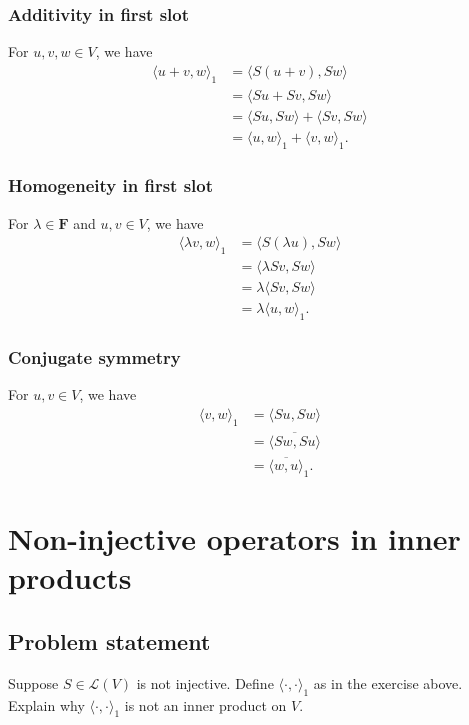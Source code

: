 \documentclass{article}
\begin{document}
\subsubsection*{Additivity in first slot}
For $u,v,w\in V$, we have
\begin{align*}
    \langle u+v,w\rangle_1&=\langle S(u+v),Sw\rangle\\
    &=\langle Su+Sv,Sw\rangle\\
    &=\langle Su,Sw\rangle+\langle Sv,Sw\rangle\\
    &=\langle u,w\rangle_1 + \langle v,w\rangle_1.
\end{align*}

\subsubsection*{Homogeneity in first slot}
For $\lambda\in\mathbf{F}$ and $u,v\in V$, we have
\begin{align*}
    \langle \lambda v,w\rangle_1&=\langle S( \lambda u),Sw\rangle\\
    &=\langle \lambda Sv,Sw\rangle\\
    &=\lambda \langle Sv,Sw\rangle\\
    &=\lambda\langle u,w\rangle_1.
\end{align*}

\subsubsection*{Conjugate symmetry}
For $u,v\in V$, we have
\begin{align*}
    \langle v,w\rangle_1&=\langle Su,Sw\rangle\\
    &=\overline{\langle Sw,Su\rangle}\\
    &=\overline{\langle w,u\rangle}_1.
\end{align*}

\clearpage

\renewcommand{\thesection}{25}
\section{Non-injective operators in inner products}
\subsection*{Problem statement}
Suppose $S\in\mathcal{L}(V)$ is not injective. 
Define $\langle\cdot,\cdot\rangle_1$ as in the exercise above. 
Explain why $\langle\cdot,\cdot\rangle_1$ is not an inner product on $V$.
\end{document}
